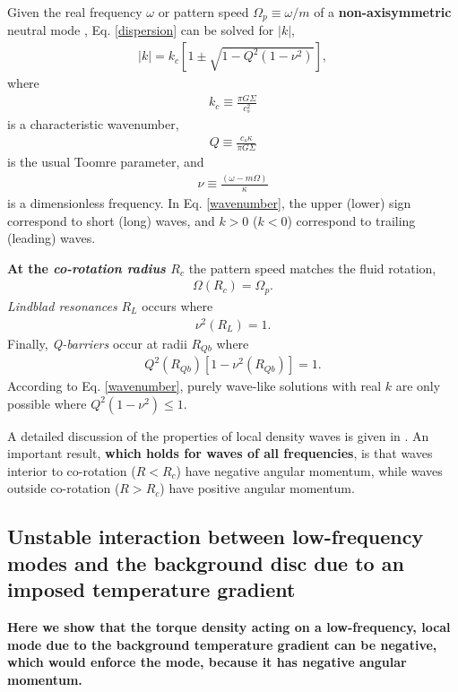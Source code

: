Given the real frequency $\omega$ or pattern speed $\Omega_p\equiv  
\omega/m$ of a {\bf non-axisymmetric} neutral mode 
, Eq. \ref{dispersion} can be solved 
for $|k|$, 
\begin{align}\label{wavenumber}
|k| = k_c\left[1 \pm \sqrt{1 -
     Q^2(1-\nu^2)}\right], 
\end{align}
where 
 \begin{align}
   k_c \equiv \frac{\pi G \Sigma}{c_s^2}
 \end{align}
 is a characteristic wavenumber, 
\begin{align}
  Q \equiv \frac{c_s\kappa}{\pi G \Sigma}
\end{align}
is the usual Toomre parameter, and
\begin{align}
  \nu \equiv \frac{(\omega - m\Omega)}{\kappa}
\end{align}
is a dimensionless frequency. In
Eq. \ref{wavenumber}, the upper (lower) sign correspond to short
(long) waves, and $k>0$ ($k<0$) correspond to trailing (leading)
waves.    

{\bf At the \emph{co-rotation radius} $R_c$} the pattern speed matches
the fluid rotation,
\begin{align}
  \Omega(R_c) = \Omega_p.
\end{align}
\emph{Lindblad resonances} $R_L$ occurs where
\begin{align}
  \nu^2(R_L) = 1. 
\end{align}
Finally, \emph{Q-barriers} occur at radii $R_{Qb}$ where
\begin{align}
  Q^2(R_{Qb})\left[1-\nu^2(R_{Qb})\right] = 1.  
\end{align}
According to Eq. \ref{wavenumber}, purely wave-like solutions with
real $k$ are only possible where $Q^2(1-\nu^2)\leq1$.  

A detailed discussion of the properties of local density waves 
is given in \cite{shu91}. An important result, {\bf which holds for
  waves of all frequencies}, is that
waves interior to co-rotation ($R<R_c$) have negative angular momentum, while
waves outside co-rotation ($R>R_c$) have positive angular
momentum. 

\subsection{Unstable interaction between low-frequency modes 
  and the background disc due to an imposed temperature gradient}
{\bf 
Here we show that the torque density acting on a low-frequency, 
local mode due to the background temperature gradient can be negative, which 
would enforce the mode, because it has negative angular momentum.  
}

